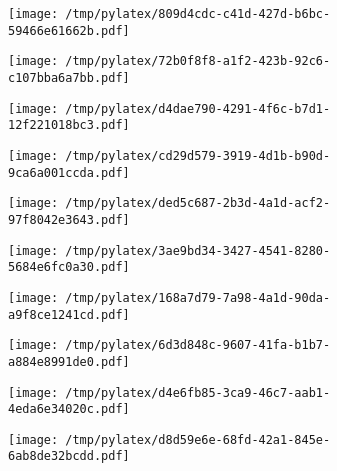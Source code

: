 \documentclass{article}
\begin{document}
\begin{figure}[htbp]
\begin{subfigure}[b]{.3\linewidth}
\texttt{[image: /tmp/pylatex/809d4cdc-c41d-427d-b6bc-59466e61662b.pdf]}
\end{subfigure}
\begin{subfigure}[b]{.3\linewidth}
\texttt{[image: /tmp/pylatex/72b0f8f8-a1f2-423b-92c6-c107bba6a7bb.pdf]}
\end{subfigure}
\begin{subfigure}[b]{.3\linewidth}
\texttt{[image: /tmp/pylatex/d4dae790-4291-4f6c-b7d1-12f221018bc3.pdf]}
\end{subfigure}
\begin{subfigure}[b]{.3\linewidth}
\texttt{[image: /tmp/pylatex/cd29d579-3919-4d1b-b90d-9ca6a001ccda.pdf]}
\end{subfigure}
\begin{subfigure}[b]{.3\linewidth}
\texttt{[image: /tmp/pylatex/ded5c687-2b3d-4a1d-acf2-97f8042e3643.pdf]}
\end{subfigure}
\begin{subfigure}[b]{.3\linewidth}
\texttt{[image: /tmp/pylatex/3ae9bd34-3427-4541-8280-5684e6fc0a30.pdf]}
\end{subfigure}
\begin{subfigure}[b]{.3\linewidth}
\texttt{[image: /tmp/pylatex/168a7d79-7a98-4a1d-90da-a9f8ce1241cd.pdf]}
\end{subfigure}
\begin{subfigure}[b]{.3\linewidth}
\texttt{[image: /tmp/pylatex/6d3d848c-9607-41fa-b1b7-a884e8991de0.pdf]}
\end{subfigure}
\begin{subfigure}[b]{.3\linewidth}
\texttt{[image: /tmp/pylatex/d4e6fb85-3ca9-46c7-aab1-4eda6e34020c.pdf]}
\end{subfigure}
\begin{subfigure}[b]{.3\linewidth}
\texttt{[image: /tmp/pylatex/d8d59e6e-68fd-42a1-845e-6ab8de32bcdd.pdf]}
\end{subfigure}
\end{figure}
\end{document}
